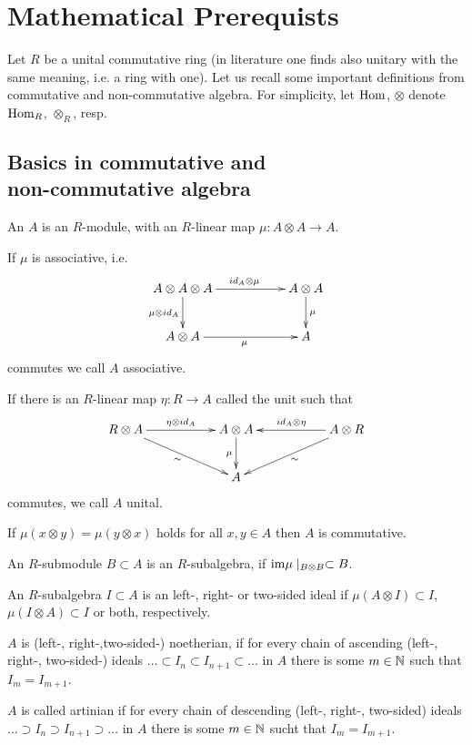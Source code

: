 \section{Mathematical Prerequists}
Let $R$ be a unital commutative ring (in literature one finds also unitary with the same meaning, i.e. a ring with one). Let us recall some important definitions from commutative and non-commutative algebra. For simplicity, let $\mathrm{Hom}$, $\otimes$ denote $\mathrm{Hom}_R$, $\otimes_R$, resp.
\subsection{\texorpdfstring{Basics in commutative and\\non-commutative algebra}{Basics in commutative and non-commutative algebra}}
\begin{defi}\label{defi01}
An  $A$ is an $R$-module, with an $R$-linear map $\mu : A \otimes A \longrightarrow A$. \bn
\item If $\mu$ is associative, i.e.
$$\xymatrix{
A \otimes A \otimes A \ar[rr]^{id_A \otimes \mu} \ar[d]_{\mu \otimes id_A} & & A \otimes A \ar[d]^{\mu}\\
A \otimes A \ar[rr]_{\mu} &&A\\
}$$
commutes we call $A$ associative.
\item\label{alg_unital} %
If there is an $R$-linear map $\eta : R \longrightarrow A$ called the unit such that
$$\xymatrix{
R \otimes A  \ar[rr]^{\eta \otimes id_A} \ar[rrd]_\sim& & A \otimes A\ar[d]_\mu& & A \otimes R\ar[ll]_{id_A \otimes \eta} \ar[lld]^\sim\\
&&A&&\\
}$$
commutes, we call $A$ unital.
\item If $\mu(x \otimes y) = \mu(y \otimes x)$ holds for all $x, y \in A$ then $A$ is commutative.
\item An $R$-submodule $B \subset A$ is an $R$-subalgebra, if $\mathrm{im} \mu\mid_{B\otimes B} \subset B$.
\item An $R$-subalgebra $I \subset A$ is an left-, right- or two-sided ideal if $\mu(A \otimes I) \subset I$, $\mu(I \otimes A) \subset I$ or both, respectively.
\item $A$ is (left-, right-,two-sided-) noetherian, if for every chain of ascending (left-, right-, two-sided-) ideals $\ldots \subset I_{n} \subset I_{n+1} \subset \ldots$ in $A$ there is some $m \in \mathbb{N}$ such that $I_m = I_{m+1}$.
\item $A$ is called artinian if for every chain of descending (left-, right-, two-sided) ideals $\ldots \supset I_n \supset I_{n+1} \supset \ldots$ in $A$ there is some $m \in \mathbb{N}$ sucht that $I_{m} = I_{m+1}$.
\en
\end{defi}
